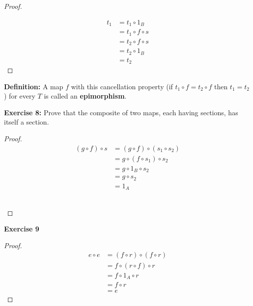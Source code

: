 \documentclass{book}
\begin{document}
\begin{proof}
  ~\\
  \begin{align*}
    t_1 & = t_1 \circ 1_B \\
        & = t_1 \circ f \circ s \\
        & = t_2 \circ f \circ s \\
        & = t_2 \circ 1_B \\
        & = t_2
  \end{align*}
\end{proof}

\begin{flushleft}
  \textbf{Definition:} A map $f$ with this cancellation property (if $t_1 \circ f =
  t_2 \circ f$ then $t_1 = t_2$) for every $T$ is called an
  \textbf{epimorphism}.
\end{flushleft}

\textbf{Exercise 8:} Prove that the composite of two maps, each having sections,
has itself a section.
\begin{proof}
  \begin{align*}
  (g \circ f) \circ s & = (g \circ f) \circ (s_1 \circ s_2) \\
                      & = g \circ (f \circ s_1) \circ s_2 \\
                      & = g \circ 1_{B} \circ s_2 \\
                      & = g \circ s_2 \\
                      & = 1_{A}
\end{align*}
~\\
\end{proof}


\textbf{Exercise 9}
\begin{proof}
  \begin{align*}
    e \circ e & = (f \circ r) \circ (f \circ r) \\
              & = f \circ (r \circ f) \circ r \\
              & = f \circ 1_{A} \circ r \\
              & = f \circ r \\
              & = e 
  \end{align*}
\end{proof}
\end{document}
